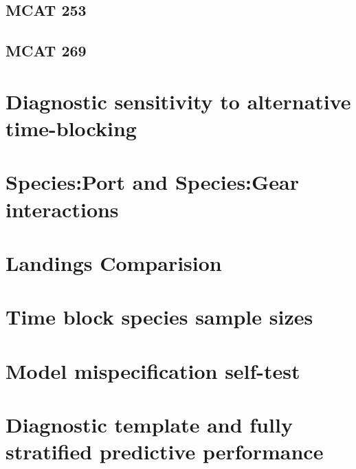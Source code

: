 \documentclass[12pt]{article}
\begin{document}
\subsection{MCAT 253}

\subsection{MCAT 269}

%
\clearpage
%
\section{Diagnostic sensitivity to alternative time-blocking}

%
\clearpage
%
\section{Species:Port and Species:Gear interactions}

%
\clearpage
%
\section{Landings Comparision}

%
\clearpage
%
\section{Time block species sample sizes}

%
\clearpage
%
\section{Model mispecification self-test}













%
\clearpage
%
\section{Diagnostic template and fully stratified predictive performance}
\end{document}
